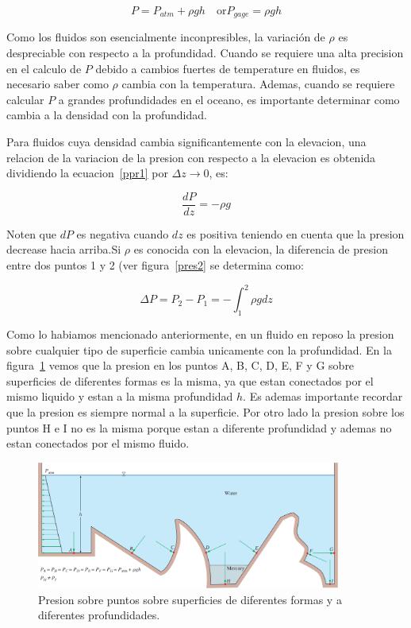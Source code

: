 \documentclass[10pt, oneside]{article}
\begin{document}
\begin{equation}
P = P_{atm} + \rho g h \quad \text{or} P_{gage}=\rho g h
\label{ppr3}
\end{equation}

Como los fluidos son esencialmente inconpresibles, la variaci\'on de $\rho$ es despreciable con respecto a la profundidad. Cuando se requiere una alta precision en el calculo de $P$  debido a cambios fuertes de temperature en fluidos, es necesario saber como $\rho$ cambia con la temperatura. Ademas, cuando se requiere calcular  $P$ a grandes profundidades en el oceano, es importante determinar como cambia a la densidad con la profundidad.

Para fluidos cuya densidad cambia significantemente con la elevacion, una relacion de la variacion de la presion con respecto a la elevacion es obtenida dividiendo la ecuacion~\ref{ppr1} por $\Delta z \rightarrow 0$, es:

\begin{equation}
\frac{dP}{dz} = -\rho g
\label{ppr4}
\end{equation}

Noten que $dP$ es negativa cuando $dz$ es positiva teniendo en cuenta que la presion decrease hacia arriba.Si $\rho$ es conocida con la elevacion, la diferencia de presion entre dos puntos 1 y 2 (ver figura~\ref{pres2} se determina como:

\begin{equation}
\Delta P = P_2 - P_1 = -\int_1^2 \rho g dz
\label{ppr5}
\end{equation}

Como lo habiamos mencionado anteriormente, en un fluido en reposo la presion sobre cualquier tipo de superficie cambia unicamente con la profundidad. En la figura~\ref{pres3} vemos que la presion en los puntos A, B, C, D, E, F y G sobre superficies de diferentes formas es la misma, ya que estan conectados por el mismo liquido y estan a la misma profundidad $h$. Es ademas importante recordar que la presion es siempre normal a la superficie. Por otro lado la presion sobre los puntos H e I no es la misma porque estan a diferente profundidad y ademas no estan conectados por el mismo fluido. 

\begin{figure}[h]
\centering
\includegraphics[width=10cm]{pres3}
\caption{Presion sobre puntos sobre superficies de diferentes formas y a diferentes profundidades.}
\label{pres3}
\end{figure}
\end{document}
